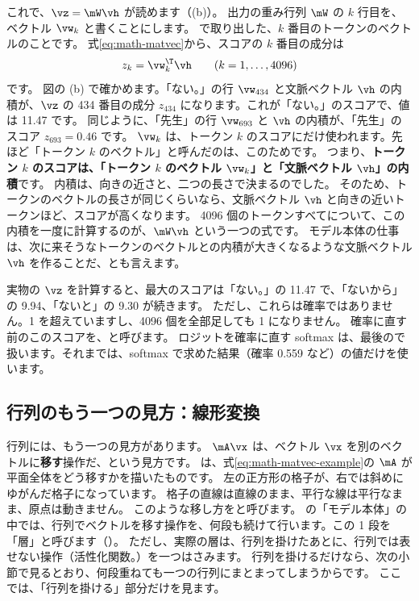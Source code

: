 これで、$\vz=\mW\vh$ が読めます（(b)）。
出力の重み行列 $\mW$ の $k$ 行目を、ベクトル $\vw_k$ と書くことにします。
で取り出した、$k$ 番目のトークンのベクトルのことです。
式\eqref{eq:math-matvec}から、スコアの $k$ 番目の成分は
\begin{equation}
z_k=\vw_k^\T\vh \qquad (k=1,\dots,4096)
\label{eq:math-logit}
\end{equation}
です。
図の (b) で確かめます。「ない。」の行 $\vw_{434}$ と文脈ベクトル $\vh$ の内積が、$\vz$ の 434 番目の成分 $z_{434}$ になります。これが「ない。」のスコアで、値は 11.47 です。
同じように、「先生」の行 $\vw_{693}$ と $\vh$ の内積が、「先生」のスコア $z_{693}=0.46$ です。
$\vw_k$ は、トークン $k$ のスコアにだけ使われます。先ほど「トークン $k$ のベクトル」と呼んだのは、このためです。
つまり、\textbf{トークン $k$ のスコアは、「トークン $k$ のベクトル $\vw_k$」と「文脈ベクトル $\vh$」の内積}です。
内積は、向きの近さと、二つの長さで決まるのでした。
そのため、トークンのベクトルの長さが同じくらいなら、文脈ベクトル $\vh$ と向きの近いトークンほど、スコアが高くなります。
4096 個のトークンすべてについて、この内積を一度に計算するのが、$\mW\vh$ という一つの式です。
モデル本体の仕事は、次に来そうなトークンのベクトルとの内積が大きくなるような文脈ベクトル $\vh$ を作ることだ、とも言えます。

実物の $\vz$ を計算すると、最大のスコアは「ない。」の 11.47 で、「ないから」の 9.94、「ないと」の 9.30 が続きます。
ただし、これらは確率ではありません。1 を超えていますし、4096 個を全部足しても 1 になりません。
確率に直す前のこのスコアを、と呼びます。
ロジットを確率に直す softmax は、最後ので扱います。それまでは、softmax で求めた結果（確率 0.559 など）の値だけを使います。

\subsection*{行列のもう一つの見方：線形変換}

行列には、もう一つの見方があります。
$\mA\vx$ は、ベクトル $\vx$ を別のベクトルに\textbf{移す}操作だ、という見方です。
は、式\eqref{eq:math-matvec-example}の $\mA$ が平面全体をどう移すかを描いたものです。
左の正方形の格子が、右では斜めにゆがんだ格子になっています。
格子の直線は直線のまま、平行な線は平行なまま、原点は動きません。
このような移し方をと呼びます。
の「モデル本体」の中では、行列でベクトルを移す操作を、何段も続けて行います。この 1 段を「層」と呼びます（）。
ただし、実際の層は、行列を掛けたあとに、行列では表せない操作（活性化関数。）を一つはさみます。
行列を掛けるだけなら、次の小節で見るとおり、何段重ねても一つの行列にまとまってしまうからです。
ここでは、「行列を掛ける」部分だけを見ます。

